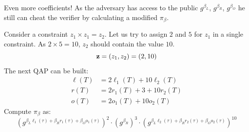 \documentclass{zkdl-presentation-template}
\begin{document}
    \begin{frame}{Even more coefficients!}
        As the adversary has access to the public $g^{\beta_L}$, $g^{\beta_R}$, $g^{\beta_O}$ he still can cheat the verifier by calculating a modified $\pi_{\beta}$.

        \begin{example}
            \small
            Consider a constraint $z_1 \times z_1 = z_2$. Let us try to assign $2$ and $5$ for $z_1$ in a single constraint. As $2 \times 5 = 10$, $z_2$ should contain the value $10$.
            \vspace{-5pt}
            \begin{equation*}
                \mathbf{z} = (z_1, z_2) = (2, 10)
                \vspace{-5pt}
            \end{equation*}
            \pause
            The next QAP can be built:
            \vspace{-5pt}
            \begin{align*}
                \ell(T) &= 2\ell_1(T) + 10\ell_2(T) \\
                r(T) &= 2r_1(T) + 3 + 10r_2(T) \\
                o(T) &= 2o_1(T) + 10o_2(T)
            \end{align*}
            \pause
            Compute $\pi_{\beta}$ as:
            \vspace{-5pt}
            \begin{equation*}
                (g^{\beta_L\ell_1(\tau) + \beta_Rr_1(\tau) + \beta_Oo_1(\tau)})^2 \cdot (g^{\beta_R})^3 \cdot (g^{\beta_L\ell_2(\tau) + \beta_Rr_2(\tau) + \beta_Oo_2(\tau)})^{10}
            \end{equation*}
        \end{example}
    \end{frame}
\end{document}
